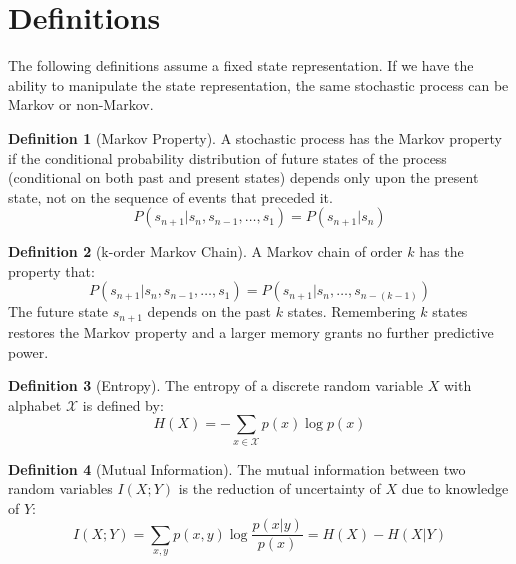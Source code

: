 \documentclass{article} %
\title{}
\author{}
\theoremstyle{definition}
\newtheorem{definition}{Definition}[section]
\begin{document}
\maketitle

\begin{abstract}
We seek to contribute:\\
1) A clear understanding of Partial Observability as it relates to
state, agent, and task.\\
2) A measure of the degree to which a domain is partially observable.\\
3) A way to quantify the deficiency of a given state representation.\\
\end{abstract}

\section{Definitions}
The following definitions assume a fixed state representation. If we
have the ability to manipulate the state representation, the same
stochastic process can be Markov or non-Markov.

\begin{definition}[Markov Property]
\label{def:markov}
A stochastic process has the Markov property if the conditional
probability distribution of future states of the process (conditional
on both past and present states) depends only upon the present state,
not on the sequence of events that preceded it.
\[
P(s_{n+1} | s_{n}, s_{n-1}, \dots, s_{1}) = P(s_{n+1} | s_{n})
\]
\end{definition}

\begin{definition}[k-order Markov Chain]
A Markov chain of order $k$ has the property that:
\[
P(s_{n+1} | s_{n}, s_{n-1}, \dots, s_{1}) = P(s_{n+1} | s_{n}, \dots, s_{n-(k-1)})
\]
The future state $s_{n+1}$ depends on the past $k$ states. Remembering
$k$ states restores the Markov property and a larger memory grants no
further predictive power.
\end{definition}

\begin{definition}[Entropy]
\label{def:entropy}
The entropy of a discrete random variable $X$ with alphabet $\mathcal{X}$ is
defined by:
\[
H(X) = -\sum_{x\in \mathcal{X}} p(x) \log p(x)
\]
\end{definition}

\begin{definition}[Mutual Information]
The mutual information between two random variables $I(X;Y)$ is the
reduction of uncertainty of $X$ due to knowledge of $Y$:
\[
I(X;Y) = \sum_{x,y} p(x,y) \log \frac{p(x|y)}{p(x)} = H(X) - H(X|Y)
\]
\end{definition}
\end{document}
